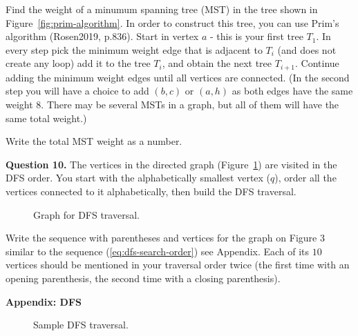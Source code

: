 \documentclass[jou]{apa6}
\begin{document}
Find the weight of a minumum spanning tree (MST) in the tree shown in Figure~\ref{fig:prim-algorithm}. 
In order to construct this tree, you can use Prim's algorithm (Rosen2019, p.836). 
Start in vertex $a$ - this is your first tree $T_1$. 
In every step pick the minimum weight edge that is adjacent to $T_i$ (and does 
not create any loop) \textendash{} add it to the tree $T_i$, and obtain the next 
tree $T_{i+1}$. Continue adding the minimum weight edges until all vertices are connected.
(In the second step you will have a choice 
to add $(b,c)$ or $(a,h)$ as both edges have the same weight $8$. There may be several MSTs
in a graph, but all of them will have the same total weight.)

Write the total MST weight as a number.


\vspace{10pt}
{\bf Question 10.}
The vertices in the directed graph (Figure~\ref{fig:dfs-traversal2}) are visited in the DFS
order. You start with the alphabetically smallest vertex ($q$), order all the vertices connected to it
alphabetically, then build the DFS traversal. 

\begin{figure}[!htb]
\caption{\label{fig:dfs-traversal2} Graph for DFS traversal.}
\end{figure}




Write the sequence with parentheses and vertices for the graph 
on Figure 3 \textendash{} similar to the sequence (\ref{eq:dfs-search-order}) \textendash{} see Appendix. 
Each of its $10$ vertices should be mentioned in your 
traversal order twice (the first time with an opening parenthesis, the second time 
with a closing parenthesis).




\mbox{}
\newpage

{\bf Appendix: DFS}

\begin{figure}[!htb]
\caption{\label{fig:dfs-traversal} Sample DFS traversal.}
\end{figure}
\end{document}
